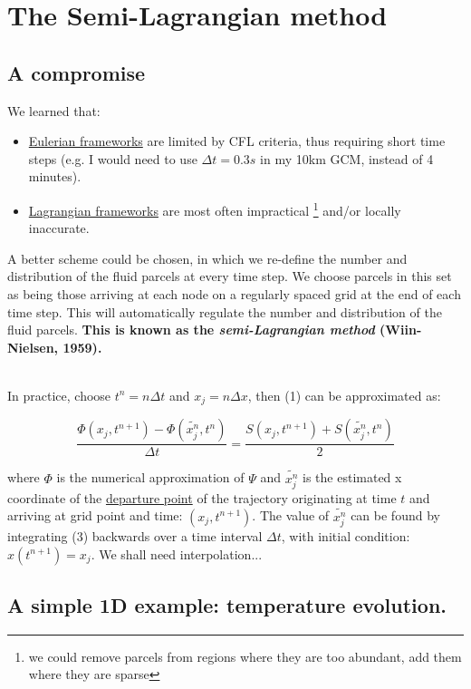 \section{The Semi-Lagrangian method}

\subsection{A compromise}

We learned that:
\begin{itemize}
	\item \underline{Eulerian frameworks} are limited by CFL criteria, thus requiring short time steps (e.g. I would need to use $\Delta t = 0.3s$ in my 10km GCM, instead of 4 minutes).
	\item \underline{Lagrangian frameworks} are most often impractical \footnote{\tiny we could remove parcels from regions where they are too abundant, add them where they are sparse} and/or locally inaccurate.
\end{itemize}

A better scheme could be chosen, in which we re-define the number and distribution of the fluid parcels at every time step. We choose parcels in this set as being those arriving at each node on a regularly spaced grid at the end of each time step. This will automatically regulate the number and distribution of the fluid parcels. \textbf{This is known as the \emph{semi-Lagrangian method} (Wiin-Nielsen, 1959).}\\

~

In practice, choose $t^n=n\Delta t$ and $x_j=n\Delta x$, then (1) can be approximated as:
 
 \begin{equation}
 \frac {\Phi(x_j,t^{n+1}) - \Phi (\tilde{x_j^n},t^{n})}{\Delta t}=\frac{S(x_j,t^{n+1}) + S (\tilde{x_j^n},t^{n})}{2}
 \label{SL}	
 \end{equation}

where $\Phi$ is the numerical approximation of $\Psi$ and $\tilde{x_j^n}$ is the estimated x coordinate of the \underline{departure point} of the trajectory originating at time $t$ and arriving at grid point and time: $(x_j,t^{n+1})$. The value of $\tilde{x_j^n}$ can be found by integrating (3) backwards over a time interval $\Delta t$, with initial condition: $x(t^{n+1})= x_j$. We shall need interpolation...


\subsection{A simple 1D example: temperature evolution.}

